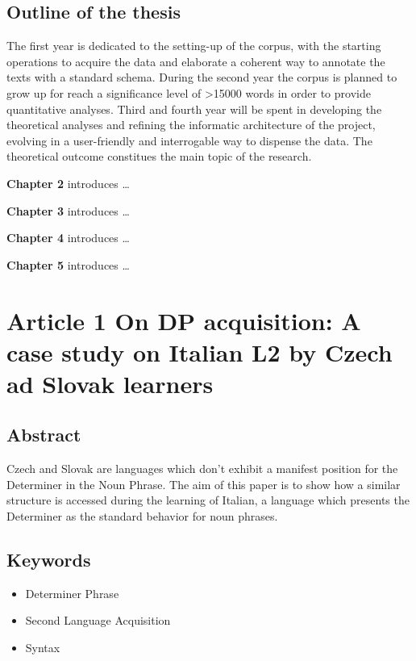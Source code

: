 \documentclass[a4paper,twoside,12pt,chapterprefix=false,bibliography=totocnumbered,listof=flat]{scrbook}
\providecommand{\tightlist}{%
  \setlength{\itemsep}{0pt}\setlength{\parskip}{0pt}}
\theoremstyle{definition}
\theoremstyle{definition}
\theoremstyle{definition}
\theoremstyle{remark}
\begin{document}
\section{Outline of the thesis}\label{outline-of-the-thesis}

The first year is dedicated to the setting-up of the corpus, with the
starting operations to acquire the data and elaborate a coherent way to
annotate the texts with a standard schema. During the second year the
corpus is planned to grow up for reach a significance level of
\textgreater{}15000 words in order to provide quantitative analyses.
Third and fourth year will be spent in developing the theoretical
analyses and refining the informatic architecture of the project,
evolving in a user-friendly and interrogable way to dispense the data.
The theoretical outcome constitues the main topic of the research.

\textbf{Chapter 2} introduces \ldots{}

\textbf{Chapter 3} introduces \ldots{}

\textbf{Chapter 4} introduces \ldots{}

\textbf{Chapter 5} introduces \ldots{}

\chapter{Article 1 \textbar{} On DP acquisition: A case study on Italian
L2 by Czech ad Slovak
learners}\label{article-1-on-dp-acquisition-a-case-study-on-italian-l2-by-czech-ad-slovak-learners}

\section*{Abstract}\label{abstract-1}

Czech and Slovak are languages which don't exhibit a manifest position
for the Determiner in the Noun Phrase. The aim of this paper is to show
how a similar structure is accessed during the learning of Italian, a
language which presents the Determiner as the standard behavior for noun
phrases.

\section*{Keywords}\label{keywords-1}

\begin{itemize}
\tightlist
\item
  Determiner Phrase
\item
  Second Language Acquisition
\item
  Syntax
\end{itemize}
\end{document}
